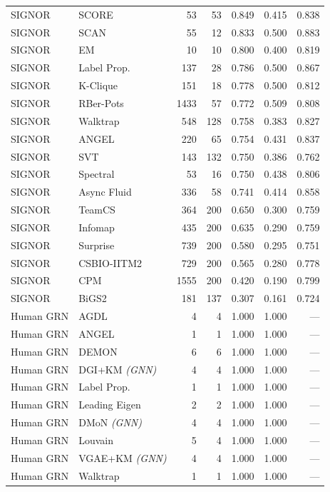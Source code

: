\begin{longtable}{llrrrrr}
SIGNOR & SCORE & 53 & 53 & 0.849 & 0.415 & 0.838 \\
SIGNOR & SCAN & 55 & 12 & 0.833 & 0.500 & 0.883 \\
SIGNOR & EM & 10 & 10 & 0.800 & 0.400 & 0.819 \\
SIGNOR & Label Prop. & 137 & 28 & 0.786 & 0.500 & 0.867 \\
SIGNOR & K-Clique & 151 & 18 & 0.778 & 0.500 & 0.812 \\
SIGNOR & RBer-Pots & 1433 & 57 & 0.772 & 0.509 & 0.808 \\
SIGNOR & Walktrap & 548 & 128 & 0.758 & 0.383 & 0.827 \\
SIGNOR & ANGEL & 220 & 65 & 0.754 & 0.431 & 0.837 \\
SIGNOR & SVT & 143 & 132 & 0.750 & 0.386 & 0.762 \\
SIGNOR & Spectral & 53 & 16 & 0.750 & 0.438 & 0.806 \\
SIGNOR & Async Fluid & 336 & 58 & 0.741 & 0.414 & 0.858 \\
SIGNOR & TeamCS & 364 & 200 & 0.650 & 0.300 & 0.759 \\
SIGNOR & Infomap & 435 & 200 & 0.635 & 0.290 & 0.759 \\
SIGNOR & Surprise & 739 & 200 & 0.580 & 0.295 & 0.751 \\
SIGNOR & CSBIO-IITM2 & 729 & 200 & 0.565 & 0.280 & 0.778 \\
SIGNOR & CPM & 1555 & 200 & 0.420 & 0.190 & 0.799 \\
SIGNOR & BiGS2 & 181 & 137 & 0.307 & 0.161 & 0.724 \\
\midrule
Human GRN & AGDL & 4 & 4 & 1.000 & 1.000 & --- \\
Human GRN & ANGEL & 1 & 1 & 1.000 & 1.000 & --- \\
Human GRN & DEMON & 6 & 6 & 1.000 & 1.000 & --- \\
Human GRN & DGI+KM \textit{(GNN)} & 4 & 4 & 1.000 & 1.000 & --- \\
Human GRN & Label Prop. & 1 & 1 & 1.000 & 1.000 & --- \\
Human GRN & Leading Eigen & 2 & 2 & 1.000 & 1.000 & --- \\
Human GRN & DMoN \textit{(GNN)} & 4 & 4 & 1.000 & 1.000 & --- \\
Human GRN & Louvain & 5 & 4 & 1.000 & 1.000 & --- \\
Human GRN & VGAE+KM \textit{(GNN)} & 4 & 4 & 1.000 & 1.000 & --- \\
Human GRN & Walktrap & 1 & 1 & 1.000 & 1.000 & --- \\

\end{longtable}
